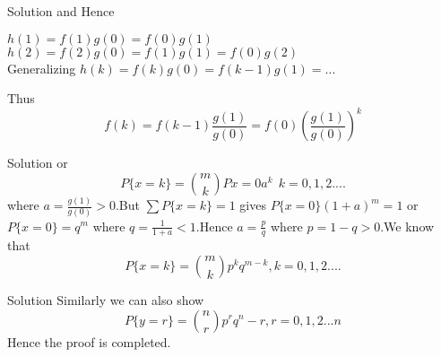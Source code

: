 \documentclass{beamer}
\begin{document}
  \begin{frame}{Solution}
      and Hence
      \begin{center}
          $h(1) = f(1)g(0) = f(0)g(1)$ \\ \vspace{6pt}
          $h(2) = f(2)g(0) =f(1)g(1) = f(0)g(2)$  \\ \vspace{6pt}
         Generalizing $h(k) = f(k)g(0) = f(k-1)g(1)=...$ \\
      \end{center}
      Thus 
      $$f(k)=f(k-1)\frac{g(1)}{g(0)} = f(0)\left( \frac{g(1)}{g(0)} \right)^{k} $$
  \end{frame}
  
  \begin{frame}{Solution}
      or
      $$P\{x=k\} = {m \choose k}P{x=0}a^k \:\:  k=0,1,2....$$
     where    $a=\frac{g(1)}{g(0)} >0$.But $\sum P\{x=k\}=1$
     gives $P\{x=0\}(1+a)^m = 1$ or $P\{x=0\} = q^m$ where
     $q=\frac{1}{1+a} <1$.Hence $a=\frac{p}{q}$ where $p=1-q 
     >0$.We know that
     $$ P\{x=k\} = {m \choose k}p^k q^{m-k} , k=0,1,2....$$
  \end{frame}
  
  \begin{frame}{Solution}
      Similarly we can also show 
      $$ P\{y=r\}  = {n \choose r}p^r q^n-r, r=0,1,2...n$$ 
      Hence the proof is completed.
  \end{frame}
  
  
\end{document}
